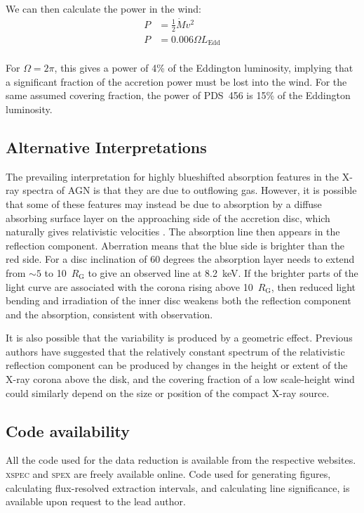 \documentclass[10pt, a4paper]{article}
\begin{document}
We can then calculate the power in the wind:
\begin{equation}
\begin{split}
P &= \frac{1}{2}\dot{M} v^2 \\
P &= 0.006\Omega L_\mathrm{Edd}\\
\end{split}
\end{equation}

For $\Omega=2\pi$, this gives a power of 4\% of the Eddington luminosity, implying that a significant fraction of the accretion power must be lost into the wind. For the same assumed covering fraction, the power of PDS~456 is 15\% of the Eddington luminosity\cite{Nardini15}.

\subsection*{Alternative Interpretations}
The prevailing interpretation for highly blueshifted absorption features in the X-ray spectra of AGN is that they are due to outflowing gas. However, it is possible that some of these features may instead be due to absorption by a diffuse absorbing surface layer on the approaching side of the accretion disc, which naturally gives relativistic velocities \cite{Gallo13}.
The absorption line then appears in the reflection component. Aberration means that the blue side is brighter than the red side. For a disc inclination of 60 degrees the absorption layer needs to extend from $\sim5$ to 10~$R_\mathrm{G}$  to give an observed  line at 8.2~keV. If the brighter parts of the light curve are associated with the corona rising above 10~$R_\mathrm{G}$, then reduced light bending and irradiation of the inner disc weakens both the reflection component and the absorption, consistent with observation. 

It is also possible that the variability is produced by a geometric effect. Previous authors have suggested that the relatively constant spectrum of the relativistic reflection component can be produced by changes in the height or extent of the X-ray corona above the disk\cite{Miniutti04}, and the covering fraction of a low scale-height wind could similarly depend on the size or position of the compact X-ray source.

\subsection*{Code availability}
All the code used for the data reduction is available from the respective websites. \textsc{xspec} and \textsc{spex} are freely available online. Code used for generating figures, calculating flux-resolved extraction intervals, and calculating line significance, is available upon request to the lead author.
\end{document}
